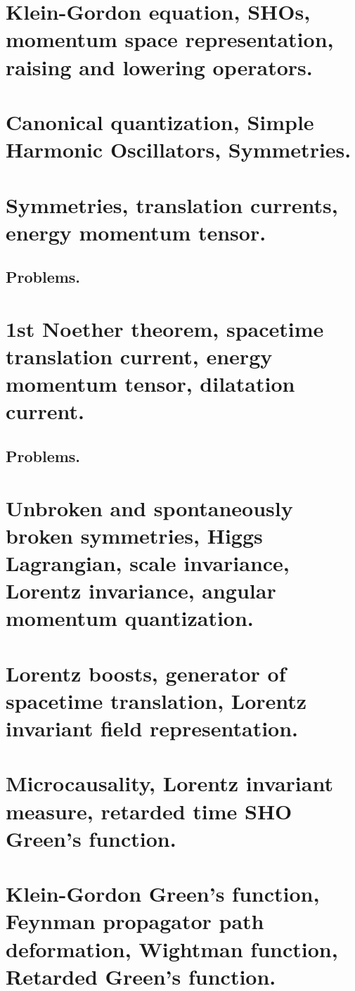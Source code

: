    \chapter{Klein-Gordon equation, SHOs, momentum space representation, raising and lowering operators.}
      
   \chapter{Canonical quantization, Simple Harmonic Oscillators, Symmetries.}
      
   \chapter{Symmetries, translation currents, energy momentum tensor.}
      
      \section{Problems.}
         
   \chapter{1st Noether theorem, spacetime translation current, energy momentum tensor, dilatation current.}
      
      \section{Problems.}
         
   \chapter{Unbroken and spontaneously broken symmetries, Higgs Lagrangian, scale invariance, Lorentz invariance, angular momentum quantization.}
      
   \chapter{Lorentz boosts, generator of spacetime translation, Lorentz invariant field representation.}
      
   \chapter{Microcausality, Lorentz invariant measure, retarded time SHO Green's function.}
      
   \chapter{Klein-Gordon Green's function, Feynman propagator path deformation, Wightman function, Retarded Green's function.}
      
